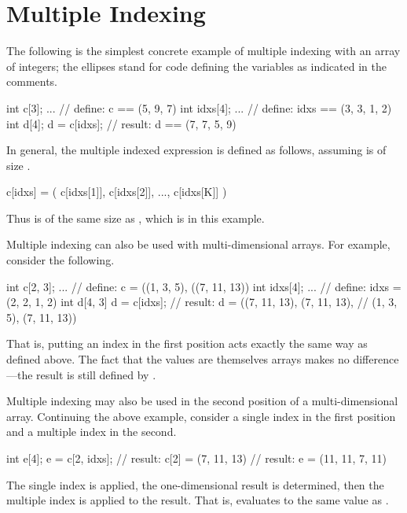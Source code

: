 \section{Multiple Indexing}

The following is the simplest concrete example of multiple indexing
with an array of integers;  the ellipses stand for code defining the
variables as indicated in the comments.
%
\begin{stancode}
int c[3];
...             // define: c == (5, 9, 7)
int idxs[4];
...             // define: idxs == (3, 3, 1, 2)
int d[4];
d = c[idxs];   // result: d == (7, 7, 5, 9)
\end{stancode}
%

In general, the multiple indexed expression  is defined
as follows, assuming  is of size .
%
\begin{stancode}
c[idxs] = ( c[idxs[1]], c[idxs[2]], ..., c[idxs[K]] )
\end{stancode}
%
Thus  is of the same size as , which is
 in this example.

Multiple indexing can also be used with multi-dimensional arrays.  For
example, consider the following.
%
\begin{stancode}
int c[2, 3];
...            // define: c = ((1, 3, 5), ((7, 11, 13))
int idxs[4];
...            // define: idxs = (2, 2, 1, 2)
int d[4, 3]
d = c[idxs];  // result: d = ((7, 11, 13), (7, 11, 13),
               //              (1, 3, 5), (7, 11, 13))
\end{stancode}
%
That is, putting an index in the first position acts exactly the same
way as defined above.  The fact that the values are themselves arrays
makes no difference---the result is still defined by .

Multiple indexing may also be used in the second position of a
multi-dimensional array.  Continuing the above example, consider a
single index in the first position and a multiple index in the second.
%
\begin{stancode}
int e[4];
e = c[2, idxs];  // result:  c[2] = (7, 11, 13)
                  // result:  e = (11, 11, 7, 11)
\end{stancode}
%
The single index is applied, the one-dimensional result is determined,
then the multiple index is applied to the result.  That is,
 evaluates to the same value as .

